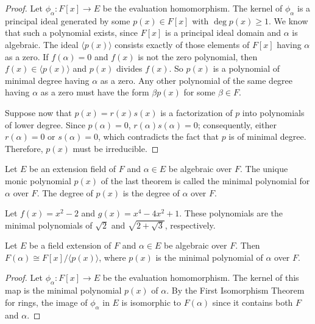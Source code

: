  
\begin{proof}
Let $\phi_{\alpha} : F[x] \rightarrow E$ be the evaluation
homomorphism. The kernel of $\phi_{\alpha}$ is a principal ideal
generated by some $p(x) \in F[x]$ with $\deg p(x) \geq 1$. We know
that such a polynomial exists, since $F[x]$ is a principal ideal domain
and $\alpha$ is algebraic. The ideal $\langle p(x) \rangle$ consists
exactly of those elements of $F[x]$ having $\alpha$ as a zero. If $f(
\alpha ) = 0$ and $f(x)$ is not the zero polynomial, then $f(x) \in
\langle p(x) \rangle$ and $p(x)$ divides $f(x)$. So $p(x)$ is a
polynomial of minimal degree having $\alpha$ as a zero. Any other
polynomial of the same degree having $\alpha$ as a zero must have the
form $\beta p( x)$ for some $\beta \in F$. 
 

Suppose now that $p(x) = r(x) s(x)$ is a factorization of $p$ into
polynomials of lower degree. Since $p( \alpha ) = 0$, $r( \alpha ) s(
\alpha ) = 0$; consequently, either \mbox{$r( \alpha )=0$} or
\mbox{$s( \alpha ) = 0$}, which contradicts the fact that $p$ is of
minimal degree. Therefore, $p(x)$ must be irreducible.
\end{proof}
 

\medskip
 
 
Let $E$ be an extension field of $F$ and $\alpha \in E$ be algebraic
over $F$. The unique monic polynomial $p(x)$ of the last theorem is
called the {\bfi minimal
polynomial\/} for
$\alpha$ over $F$. The degree of $p(x)$ is the {\bfi degree of
$\alpha$ over $F$}. 


\begin{example}{}
Let $f(x) = x^2 - 2$ and $g(x) = x^4 - 4 x^2 + 1$. These polynomials
are the minimal polynomials of $\sqrt{2}$ and $\sqrt{2 + \sqrt{3} }$,
respectively. 
\end{example}
 

\begin{proposition}\label{fields:min_poly_prop}
Let $E$ be a field extension of $F$ and $\alpha \in E$ be algebraic
over $F$.  Then $F( \alpha ) \cong F[x] / \langle p(x) \rangle$, where
$p(x)$ is the minimal polynomial of $\alpha$ over $F$.
\end{proposition}


\begin{proof}
Let $\phi_{\alpha} : F[x] \rightarrow E$ be the evaluation
homomorphism. The kernel of this map is the minimal polynomial $p(x)$
of $\alpha$. By the First Isomorphism Theorem for rings, the image of
$\phi_{\alpha}$ in $E$ is isomorphic to $F( \alpha )$ since it
contains both $F$ and $\alpha$.
\end{proof}
 

